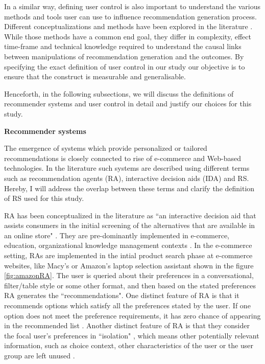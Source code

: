 \documentclass[a4paper,12pt]{article}
\begin{document}
In a similar way, defining user control is also important to understand the various methods and tools user can use to influence recommendation generation process. Different conceptualizations and methods have been explored in the literature \citep{pu2012evaluating}. While those methods have a common end goal, they differ in complexity,  effect time-frame and technical knowledge required to understand the causal links between manipulations of recommendation generation and the outcomes. By specifying the exact definition of user control in our study our objective is to ensure that the construct is measurable and generalisable. 

Henceforth, in the following subsections, we will discuss the definitions of recommender systems and user control in detail and justify our choices for this study.

\textbf{Recommender systems}\label{chapter:recommenderSystemsAgentsDifferentiation}

The emergence of systems which provide personalized or tailored recommendations is closely connected to rise of e-commerce and Web-based technologies. In the literature such systems are described using different terms such as recommendation agents (RA), interactive decision aids (IDA) and RS. Hereby, I will address the overlap between these terms and clarify the definition of RS used for this study.

RA has been conceptualized in the literature as ``an interactive decision aid that assists consumers in the initial screening of the alternatives that are available in 
an online store" \citep{haubl2000consumer, xiao2007commerce}. They are pre-dominantly implemented in e-commerce, education, organizational knowledge management contexts \citep{xiao2007commerce}. In the e-commerce setting,  RAs are implemented in the intial product search phase at e-commerce websites, like Macy's or Amazon's laptop selection assistant shown in the figure \ref{fig:amazonRA}. The user is queried about their preferences in a conversational, filter/table style or some other  format, and then based on the stated preferences RA generates the ``recommendations". One distinct feature of RA is that it recommends options which satisfy all the preferences stated by the user. If one option does not meet the preference requirements, it has zero chance of appearing in the recommended list \citep{haubl2000consumer}. Another distinct feature of RA is that they consider the focal user's preferences in ``isolation" , which means other potentially relevant information, such as choice context, other characteristics of the user or the user group are left unused \citep{wang2008attributions}.
\end{document}

